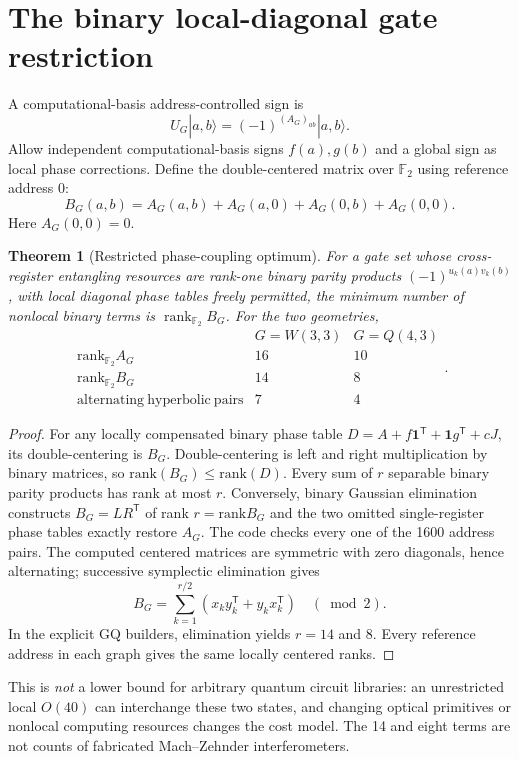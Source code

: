 \documentclass[10pt]{article}
\newtheorem{theorem}{Theorem}
\begin{document}
\section{The binary local-diagonal gate restriction}
A computational-basis address-controlled sign is
\[
U_G|a,b\rangle=(-1)^{(A_G)_{ab}}|a,b\rangle.
\]
Allow independent computational-basis signs
$f(a),g(b)$ and a global sign as local phase
corrections. Define the double-centered matrix
over $\mathbb F_2$ using reference address $0$:
\[
B_G(a,b)=A_G(a,b)+A_G(a,0)+A_G(0,b)+A_G(0,0).
\]
Here $A_G(0,0)=0$.
\begin{theorem}[Restricted phase-coupling optimum]
For a gate set whose cross-register entangling
resources are rank-one binary parity products
$(-1)^{u_k(a)v_k(b)}$, with local diagonal
phase tables freely permitted, the minimum
number of nonlocal binary terms is
$\operatorname{rank}_{\mathbb F_2}B_G$.
For the two geometries,
\[
\begin{array}{c|cc}
&G=W(3,3)&G=Q(4,3)\\\hline
\mathrm{rank}_{\mathbb F_2}A_G&16&10\\
\mathrm{rank}_{\mathbb F_2}B_G&14&8\\
\mathrm{alternating\ hyperbolic\ pairs}&7&4
\end{array}.
\]
\end{theorem}
\begin{proof}
For any locally compensated binary phase table
$D=A+f\mathbf1^{\mathsf T}
+\mathbf1g^{\mathsf T}
+cJ$, its double-centering is $B_G$.
Double-centering is left and right
multiplication by binary matrices,
so $\mathrm{rank}(B_G)\le\mathrm{rank}(D)$.
Every sum of $r$ separable binary parity
products has rank at most $r$. Conversely,
binary Gaussian elimination constructs
$B_G=LR^{\mathsf T}$ of rank $r=\mathrm{rank}B_G$
and the two omitted single-register phase
tables exactly restore $A_G$. The code
checks every one of the 1600 address pairs.
The computed centered matrices are symmetric
with zero diagonals, hence alternating;
successive symplectic elimination gives
\[
B_G=\sum_{k=1}^{r/2}
\left(x_ky_k^{\mathsf T}+y_kx_k^{\mathsf T}\right)
\quad(\bmod 2).
\]
In the explicit GQ builders, elimination yields
$r=14$ and $8$. Every reference address in
each graph gives the same locally centered ranks.
\end{proof}
This is \emph{not} a lower bound for arbitrary
quantum circuit libraries: an unrestricted
local $O(40)$ can interchange these two states,
and changing optical primitives or nonlocal
computing resources changes the cost model.
The 14 and eight terms are not counts of
fabricated Mach--Zehnder interferometers.
\end{document}
